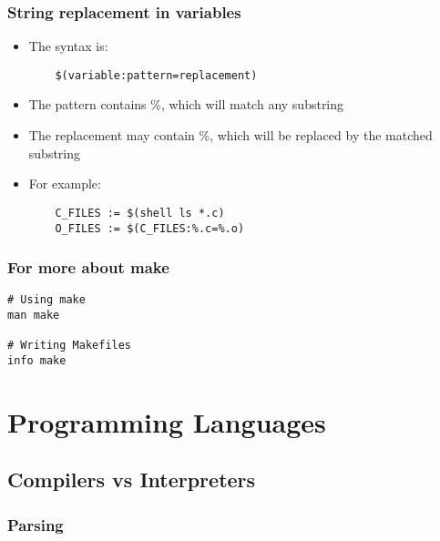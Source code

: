 \documentclass[12pt]{article}
\begin{document}
\subsubsection{String replacement in variables}

\begin{itemize}
  \item The syntax is:
  \begin{verbatim}
    $(variable:pattern=replacement)
  \end{verbatim}

  \item The pattern contains \%, which will match any substring
  \item The replacement may contain \%, which will be replaced by the matched substring
  \item For example:
  \begin{verbatim}
    C_FILES := $(shell ls *.c)
    O_FILES := $(C_FILES:%.c=%.o)
  \end{verbatim}
\end{itemize}

\subsubsection{For more about make}

\begin{verbatim}
# Using make
man make

# Writing Makefiles
info make
\end{verbatim}





















\newpage
\section{Programming Languages}

\subsection{Compilers vs Interpreters}
\subsubsection{Parsing}
\end{document}
